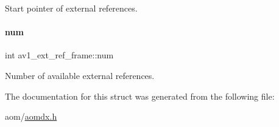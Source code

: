 Start pointer of external references. \mbox{\label{structav1__ext__ref__frame_a2d249bb9aee60c4b6c67e64b1694bc2f}} 
\paragraph{\texorpdfstring{num}{num}}
{\footnotesize\ttfamily int av1\+\_\+ext\+\_\+ref\+\_\+frame\+::num}

Number of available external references. 

The documentation for this struct was generated from the following file\+:\begin{DoxyCompactItemize}
\item 
aom/\hyperlink{aomdx_8h}{aomdx.\+h}\end{DoxyCompactItemize}
